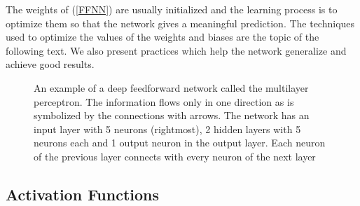 \documentclass[11pt,oneside,czech,american]{book} %
\theoremstyle{definition} %
\theoremstyle{definition}
\begin{document}
The weights of (\ref{FFNN}) are usually initialized and the learning process is to optimize them so that the network gives a meaningful prediction. The techniques used to optimize the values of the weights and biases are the topic of the following text. We also present practices which help the network generalize and achieve good results.

\begin{figure}[H]
\usetikzlibrary{positioning}
\def\layersep{2.2}
\def\nodesep{1.2}
\centering
{}
\caption{An example of a deep feedforward network called the multilayer perceptron. The information flows only in one direction as is symbolized by the connections with arrows. The network has an input layer with 5 neurons (rightmost), 2 hidden layers with 5 neurons each and 1 output neuron in the output layer. Each neuron of the previous layer connects with every neuron of the next layer}
\label{MLP}
\end{figure}

\subsection*{Activation Functions}
\end{document}
